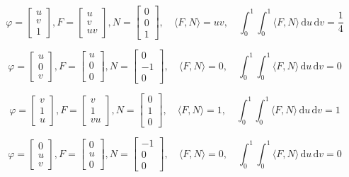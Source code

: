 \documentclass[a4paper,10pt,fleqn,twoside]{scrartcl}
\numberwithin{equation}{section}
\theoremstyle{Aufgabe}
\begin{document}
\[
\varphi = \begin{bmatrix}u\\ v\\ 1\end{bmatrix},
F = \begin{bmatrix}u\\ v\\ uv\end{bmatrix},
N = \begin{bmatrix}0\\ 0\\ 1\end{bmatrix},
\quad\langle F,N\rangle = uv,
\quad\int_0^1 \int_0^1 \langle F,N\rangle\,\mathrm du\,\mathrm dv = \frac{1}{4}
\]

\[
\varphi = \begin{bmatrix}u\\ 0\\ v\end{bmatrix},
F = \begin{bmatrix}u\\ 0\\ 0\end{bmatrix},
N = \begin{bmatrix}0\\ -1\\ 0\end{bmatrix},
\quad\langle F,N\rangle = 0,
\quad\int_0^1 \int_0^1 \langle F,N\rangle\,\mathrm du\,\mathrm dv = 0
\]

\[
\varphi = \begin{bmatrix}v\\ 1\\ u\end{bmatrix},
F = \begin{bmatrix}v\\ 1\\ vu\end{bmatrix},
N = \begin{bmatrix}0\\ 1\\ 0\end{bmatrix},
\quad\langle F,N\rangle = 1,
\quad\int_0^1 \int_0^1 \langle F,N\rangle\,\mathrm du\,\mathrm dv = 1
\]

\[
\varphi = \begin{bmatrix}0\\ u\\ v\end{bmatrix},
F = \begin{bmatrix}0\\ u\\ 0\end{bmatrix},
N = \begin{bmatrix}-1\\ 0\\ 0\end{bmatrix},
\quad\langle F,N\rangle = 0,
\quad\int_0^1 \int_0^1 \langle F,N\rangle\,\mathrm du\,\mathrm dv = 0
\]
\end{document}

